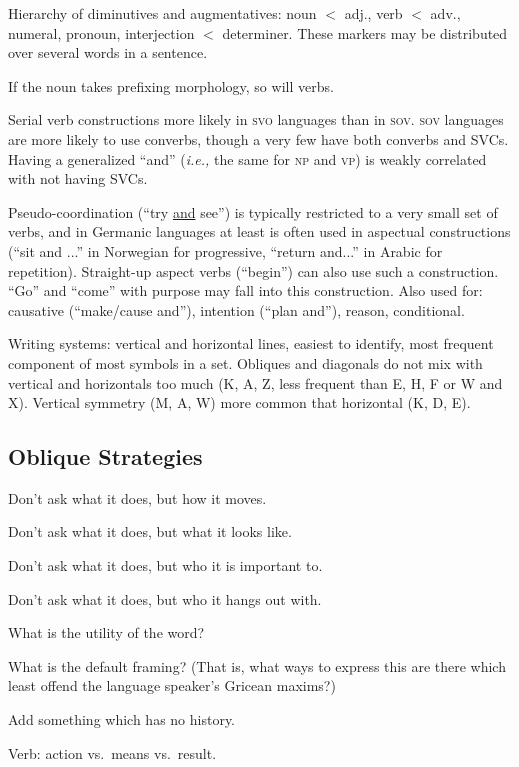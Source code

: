 \documentclass[11pt]{article}
\newcommand{\I}[1]{\textsc{#1}}   %
\begin{document}
Hierarchy of diminutives and augmentatives: noun $<$ adj., verb $<$
adv., numeral, pronoun, interjection $<$ determiner.  These markers
may be distributed over several words in a sentence.

If the noun takes prefixing morphology, so will verbs.

Serial verb constructions more likely in \I{svo} languages than in
\I{sov}.  \I{sov} languages are more likely to use converbs, though a
very few have both converbs and SVCs.  Having a generalized ``and''
(\textit{i.e.,} the same for \I{np} and \I{vp}) is weakly correlated
with not having SVCs.

Pseudo-coordination (``try \uline{and} see'') is typically restricted
to a very small set of verbs, and in Germanic languages at least is
often used in aspectual constructions (``sit and ...'' in Norwegian
for progressive, ``return and...'' in Arabic for repetition).
Straight-up aspect verbs (``begin'') can also use such a
construction. ``Go'' and ``come'' with purpose may fall into this
construction.  Also used for: causative (``make/cause and''),
intention (``plan and''), reason, conditional.

Writing systems: vertical and horizontal lines, easiest to identify,
most frequent component of most symbols in a set. Obliques and
diagonals do not mix with vertical and horizontals too much (K, A, Z,
less frequent than E, H, F or W and X). Vertical symmetry (M, A, W)
more common that horizontal (K, D, E).

\subsection{Oblique Strategies}
Don't ask what it does, but how it moves.

Don't ask what it does, but what it looks like.

Don't ask what it does, but who it is important to.

Don't ask what it does, but who it hangs out with.

What is the utility of the word?

What is the default framing?  (That is, what ways to express this are
there which least offend the language speaker's Gricean maxims?)

Add something which has no history.

Verb: action vs.\ means vs.\ result.
\end{document}
